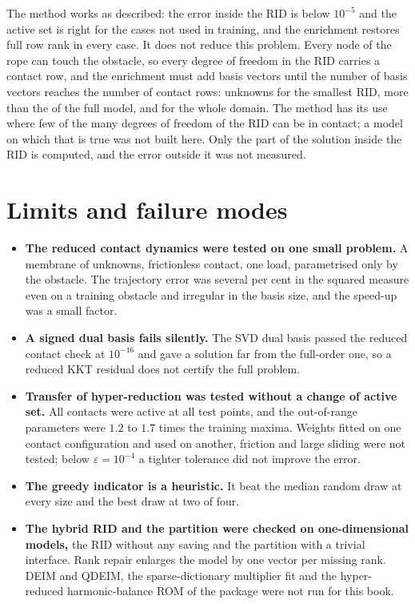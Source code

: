 The method works as described: the error inside the RID is below $10^{-5}$ and the active set is right for the cases not used in training, and the enrichment restores full row rank in every case. It does not reduce this problem. Every node of the rope can touch the obstacle, so every degree of freedom in the RID carries a contact row, and the enrichment must add basis vectors until the number of basis vectors reaches the number of contact rows: \crdOneUnk{} unknowns for the smallest RID, more than the \crdN{} of the full model, and \crdFullUnk{} for the whole domain. The method has its use where few of the many degrees of freedom of the RID can be in contact; a model on which that is true was not built here. Only the part of the solution inside the RID is computed, and the error outside it was not measured.

\section{Limits and failure modes}\label{sec:hy-limits}

\begin{limitsbox}
\begin{itemize}
\item \textbf{The reduced contact dynamics were tested on one small problem.} A membrane of \chdN{} unknowns, frictionless contact, one load, parametrised only by the obstacle. The trajectory error was several per cent in the squared measure even on a training obstacle and irregular in the basis size, and the speed-up was a small factor.
\item \textbf{A signed dual basis fails silently.} The SVD dual basis passed the reduced contact check at $10^{-16}$ and gave a solution far from the full-order one, so a reduced KKT residual does not certify the full problem.
\item \textbf{Transfer of hyper-reduction was tested without a change of active set.} All contacts were active at all test points, and the out-of-range parameters were $1.2$ to $1.7$ times the training maxima. Weights fitted on one contact configuration and used on another, friction and large sliding were not tested; below $\varepsilon=10^{-4}$ a tighter tolerance did not improve the error.
\item \textbf{The greedy indicator is a heuristic.} It beat the median random draw at every size and the best draw at two of four.
\item \textbf{The hybrid RID and the partition were checked on one-dimensional models,} the RID without any saving and the partition with a trivial interface. Rank repair enlarges the model by one vector per missing rank. DEIM and QDEIM, the sparse-dictionary multiplier fit and the hyper-reduced harmonic-balance ROM of the package were not run for this book.
\end{itemize}
\end{limitsbox}

